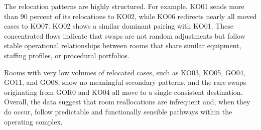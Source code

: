 \documentclass[
]{article}
\begin{document}
The relocation patterns are highly structured. For example, KO01 sends
more than 90 percent of its relocations to KO02, while KO06 redirects
nearly all moved cases to KO07. KO02 shows a similar dominant pairing
with KO01. These concentrated flows indicate that swaps are not random
adjustments but follow stable operational relationships between rooms
that share similar equipment, staffing profiles, or procedural
portfolios.

Rooms with very low volumes of relocated cases, such as KO03, KO05,
GO04, GO11, and GO08, show no meaningful secondary patterns, and the
rare swaps originating from GOR0 and KO04 all move to a single
consistent destination. Overall, the data suggest that room
reallocations are infrequent and, when they do occur, follow predictable
and functionally sensible pathways within the operating complex.
\end{document}
